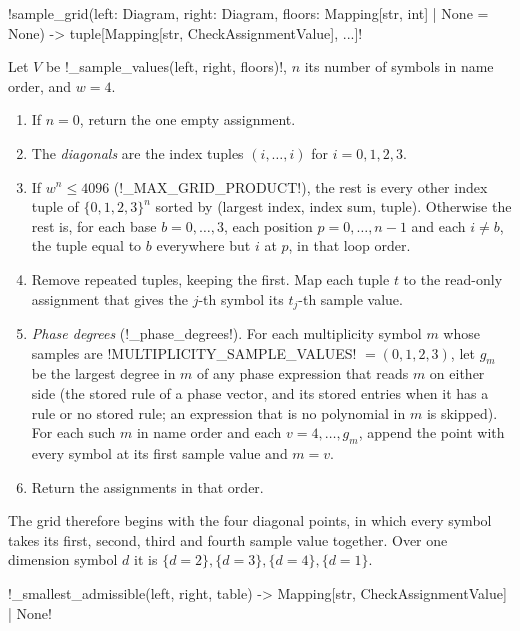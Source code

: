 \begin{signature}
\py!sample_grid(left: Diagram, right: Diagram, floors: Mapping[str, int] | None = None) -> tuple[Mapping[str, CheckAssignmentValue], ...]!
\end{signature}

\begin{algorithm}\label{alg:proofs-sample-grid}
Let $V$ be \py!_sample_values(left, right, floors)!, $n$ its number of symbols in name order, and $w=4$.
\begin{enumerate}
\item If $n=0$, return the one empty assignment.
\item The \emph{diagonals} are the index tuples $(i,\ldots,i)$ for $i=0,1,2,3$.
\item If $w^n\le 4096$ (\py!_MAX_GRID_PRODUCT!), the rest is every other index tuple of $\{0,1,2,3\}^n$ sorted by (largest index, index sum, tuple). Otherwise the rest is, for each base $b=0,\ldots,3$, each position $p=0,\ldots,n-1$ and each $i\neq b$, the tuple equal to $b$ everywhere but $i$ at $p$, in that loop order.
\item Remove repeated tuples, keeping the first. Map each tuple $t$ to the read-only assignment that gives the $j$-th symbol its $t_j$-th sample value.
\item \emph{Phase degrees} (\py!_phase_degrees!). For each multiplicity symbol $m$ whose samples are \py!MULTIPLICITY_SAMPLE_VALUES! $=(0,1,2,3)$, let $g_m$ be the largest degree in $m$ of any phase expression that reads $m$ on either side (the stored rule of a phase vector, and its stored entries when it has a rule or no stored rule; an expression that is no polynomial in $m$ is skipped). For each such $m$ in name order and each $v=4,\ldots,g_m$, append the point with every symbol at its first sample value and $m=v$.
\item Return the assignments in that order.
\end{enumerate}
\end{algorithm}

The grid therefore begins with the four diagonal points, in which every symbol takes its first, second, third and fourth sample value together. Over one dimension symbol $d$ it is $\{d=2\},\{d=3\},\{d=4\},\{d=1\}$.

\begin{signature}
\py!_smallest_admissible(left, right, table) -> Mapping[str, CheckAssignmentValue] | None!
\end{signature}

